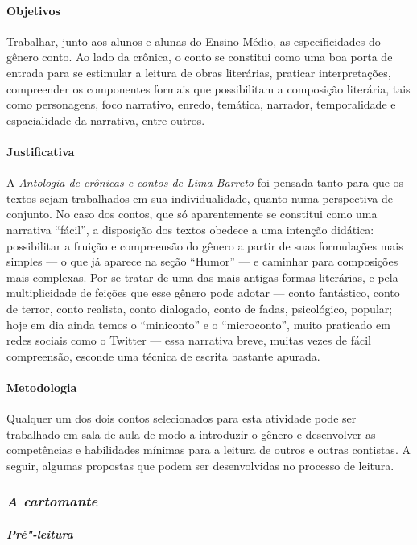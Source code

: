 \documentclass[11pt]{extarticle}
\begin{document}
\paragraph{Objetivos} Trabalhar, junto aos alunos e alunas do Ensino
Médio, as especificidades do gênero conto. Ao lado da crônica, o conto
se constitui como uma boa porta de entrada para se estimular a leitura
de obras literárias, praticar interpretações, compreender os componentes
formais que possibilitam a composição literária, tais como personagens,
foco narrativo, enredo, temática, narrador, temporalidade e
espacialidade da narrativa, entre outros.


\paragraph{Justificativa} A \emph{Antologia de crônicas e contos de Lima
Barreto} foi pensada tanto para que os textos sejam trabalhados em sua
individualidade, quanto numa perspectiva de conjunto. No caso dos
contos, que só aparentemente se constitui como uma narrativa ``fácil'',
a disposição dos textos obedece a uma intenção didática: possibilitar a
fruição e compreensão do gênero a partir de suas formulações mais
simples --- o que já aparece na seção ``Humor'' --- e caminhar para
composições mais complexas. Por se tratar de uma das mais antigas formas
literárias, e pela multiplicidade de feições que esse gênero pode adotar
--- conto fantástico, conto de terror, conto realista, conto dialogado,
conto de fadas, psicológico, popular; hoje em dia ainda temos o
``miniconto'' e o ``microconto'', muito praticado em redes sociais como
o Twitter --- essa narrativa breve, muitas vezes de fácil compreensão,
esconde uma técnica de escrita bastante apurada.

\paragraph{Metodologia} Qualquer um dos dois contos selecionados para esta
atividade pode ser trabalhado em sala de aula de modo a introduzir o
gênero e desenvolver as competências e habilidades mínimas para a
leitura de outros e outras contistas. A seguir, algumas propostas que
podem ser desenvolvidas no processo de leitura.

\subsubsection{\textit{A cartomante}}

\paragraph{\textit{Pré"-leitura}}
\end{document}
